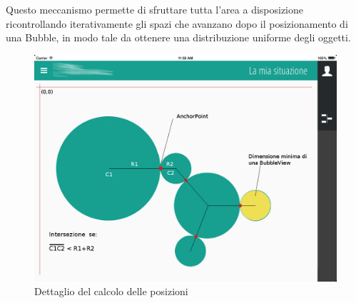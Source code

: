 Questo meccanismo permette di sfruttare tutta l'area a disposizione ricontrollando iterativamente gli spazi che avanzano dopo il posizionamento di una Bubble, in modo tale da ottenere una distribuzione uniforme degli oggetti.

\newpage
\begin{figure}[!htbp]
\centering
\includegraphics[scale=0.4]{dettagli/bubblesInView.png}
\caption{Dettaglio del calcolo delle posizioni}
\label{fig:bubblesInView}
\end{figure}

